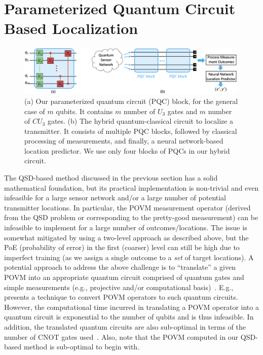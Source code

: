 \section{Parameterized Quantum Circuit Based Localization}
\label{sec:pqc-loc}


\begin{figure}
    \centering
    \includegraphics[width=0.99\textwidth]{chapters/qce/figures/pqc.png}
    \caption{(a) Our parameterized quantum circuit (PQC) block, for the general case of $m$ qubits. It contains $m$ number of $U_3$ gates and $m$ number of $CU_3$ gates.
    (b) The hybrid quantum-classical circuit to localize a transmitter. It consists of multiple PQC blocks, followed by classical processing of measurements, and finally, a neural network-based location predictor. We use only four blocks of PQCs in our hybrid circuit.
    }
    \label{fig:pqc}
\end{figure}

 The QSD-based method discussed in the previous section has a solid mathematical foundation, but its practical implementation is non-trivial and even infeasible for a large sensor network and/or a large number of potential transmitter locations. 
In particular, the POVM measurement operator (derived from the QSD problem or corresponding to the pretty-good measurement)
can be infeasible to implement for a 
large number of outcomes/locations. 
The issue is somewhat mitigated by using a two-level approach as described above, but the PoE (probability of error) 
in the first (coarser) level can still be high due to imperfect training (as we assign a single outcome to a {\em set} of
target locations). 
A potential approach to address the above challenge is to ``translate'' a given POVM into an appropriate quantum circuit comprised of quantum gates and simple
measurements (e.g., projective and/or computational basis)~\cite{pra19-povm}. E.g.,~\cite{qcompiler} presents a technique to convert POVM operators to such quantum circuits. 
However, the computational time incurred in translating a POVM operator into a quantum circuit 
is exponential to the number of qubits and is thus infeasible. In addition, the translated quantum circuits 
are also sub-optimal in terms of the number of CNOT gates used~\cite{qcompiler}.
Also, note that the POVM computed in our QSD-based method is sub-optimal to begin with.

